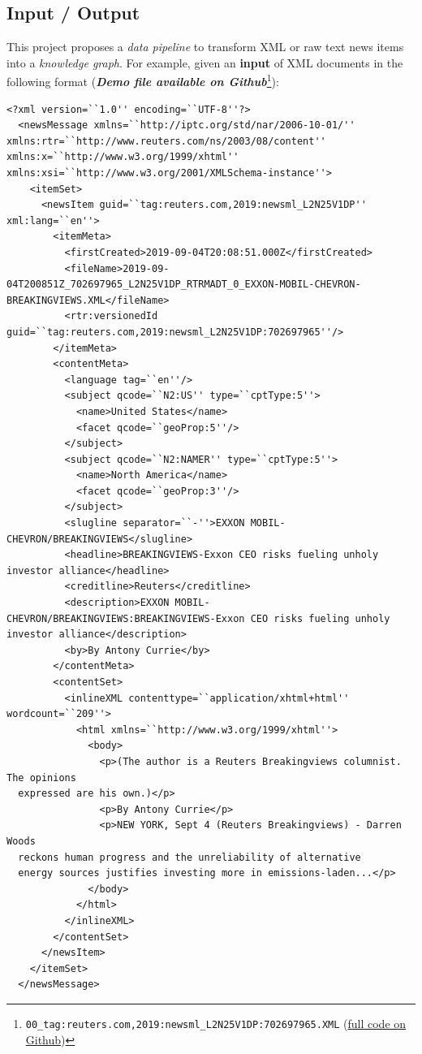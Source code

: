 \documentclass[11pt]{article}
\begin{document}
  \subsection{Input / Output}
  This project proposes a \textit{data pipeline} to transform XML or raw text news items into a \textit{knowledge graph}. For example, given an \textbf{input} of XML documents in the following format (\textit{\textbf{Demo file available on Github}}\footnote{\lstinline{00_tag:reuters.com,2019:newsml_L2N25V1DP:702697965.XML} (\href{https://github.com/Birkbeck/msc-data-science-project-2020_21---files-heychrisek/}{full code on Github})}):
  \begin{lstlisting}[basicstyle=\tiny]
  <?xml version=``1.0'' encoding=``UTF-8''?>
  <newsMessage xmlns=``http://iptc.org/std/nar/2006-10-01/'' xmlns:rtr=``http://www.reuters.com/ns/2003/08/content'' xmlns:x=``http://www.w3.org/1999/xhtml'' xmlns:xsi=``http://www.w3.org/2001/XMLSchema-instance''>
    <itemSet>
      <newsItem guid=``tag:reuters.com,2019:newsml_L2N25V1DP'' xml:lang=``en''>
        <itemMeta>
          <firstCreated>2019-09-04T20:08:51.000Z</firstCreated>
          <fileName>2019-09-04T200851Z_702697965_L2N25V1DP_RTRMADT_0_EXXON-MOBIL-CHEVRON-BREAKINGVIEWS.XML</fileName>
          <rtr:versionedId guid=``tag:reuters.com,2019:newsml_L2N25V1DP:702697965''/>
        </itemMeta>
        <contentMeta>
          <language tag=``en''/>
          <subject qcode=``N2:US'' type=``cptType:5''>
            <name>United States</name>
            <facet qcode=``geoProp:5''/>
          </subject>
          <subject qcode=``N2:NAMER'' type=``cptType:5''>
            <name>North America</name>
            <facet qcode=``geoProp:3''/>
          </subject>
          <slugline separator=``-''>EXXON MOBIL-CHEVRON/BREAKINGVIEWS</slugline>
          <headline>BREAKINGVIEWS-Exxon CEO risks fueling unholy investor alliance</headline>
          <creditline>Reuters</creditline>
          <description>EXXON MOBIL-CHEVRON/BREAKINGVIEWS:BREAKINGVIEWS-Exxon CEO risks fueling unholy investor alliance</description>
          <by>By Antony Currie</by>
        </contentMeta>
        <contentSet>
          <inlineXML contenttype=``application/xhtml+html'' wordcount=``209''>
            <html xmlns=``http://www.w3.org/1999/xhtml''>
              <body>
                <p>(The author is a Reuters Breakingviews columnist.  The opinions
  expressed are his own.)</p>
                <p>By Antony Currie</p>
                <p>NEW YORK, Sept 4 (Reuters Breakingviews) - Darren Woods
  reckons human progress and the unreliability of alternative
  energy sources justifies investing more in emissions-laden...</p>
              </body>
            </html>
          </inlineXML>
        </contentSet>
      </newsItem>
    </itemSet>
  </newsMessage>
  \end{lstlisting}
\end{document}
